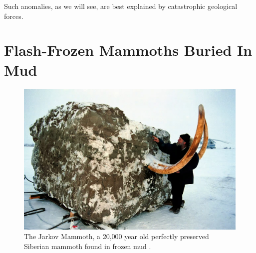 \documentclass[10pt,twocolumn,letterpaper]{article}
\begin{document}
Such anomalies, as we will see, are best explained by catastrophic geological forces.

\section{Flash-Frozen Mammoths Buried In Mud}

\begin{figure}[t]
\begin{center}
   \includegraphics[width=1\linewidth]{jarkov-mammoth.jpg}
\end{center}
   \caption{The Jarkov Mammoth, a 20,000 year old perfectly preserved Siberian mammoth found in frozen mud \cite{51}.}
\label{fig:1}
\label{fig:onecol}
\end{figure}
\end{document}
